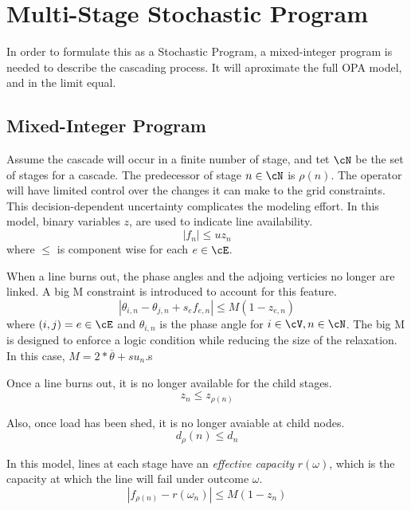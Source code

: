
\section{Multi-Stage Stochastic Program}

In order to formulate this as a Stochastic Program, a mixed-integer program is needed to describe the cascading process.  It will aproximate the full OPA model, and in the limit equal.  \\

\subsection{Mixed-Integer Program}
Assume the cascade will occur in a finite number of stage, and tet $\cN$ be the set  of stages for a cascade.  The predecessor of stage $n \in \cN$ is $\rho (n)$.  The operator will have limited control over the changes it can make to the grid constraints.  This decision-dependent uncertainty complicates the modeling effort.  In this model, binary variables $z$, are used to indicate line availability.
\begin{equation} 
\left| f_n \right| \leq u z_n 
\end{equation}
where $\leq$ is component wise for each $e \in \cE$.  

When a line burns out, the phase angles and the adjoing verticies no longer are linked.  A big M constraint is introduced to account for this feature.
\begin{equation}
\left| \theta_{i,n} - \theta_{j,n} + s_e f_{e,n}  \right| \leq M ( 1 - z_{e,n} ) 
\end{equation}
where $(i,j)=e \in \cE$ and $\theta_{i,n}$ is the phase angle for $i \in \cV, n \in \cN$.  The big M is designed to enforce a logic condition while reducing the size of the relaxation.  In this case, $M = 2*\overline{\theta} + s u_n$.s

Once a line burns out, it is no longer available for the child stages.
\begin{equation}
z_n \leq z_{ \rho (n) } 
\end{equation}

Also, once load has been shed, it is no longer avaiable at child nodes. 
\begin{equation}
d_{ \rho } (n) \leq d_n
\end{equation}

In this model, lines at each stage have an {\em effective capacity} $r ( \omega )$, which is the capacity at which the line will fail under outcome $\omega$.
\begin{equation}    
	\left| f_{\rho (n)} - r ( \omega_n ) \right| \leq M ( 1 - z_n )
\end{equation}

